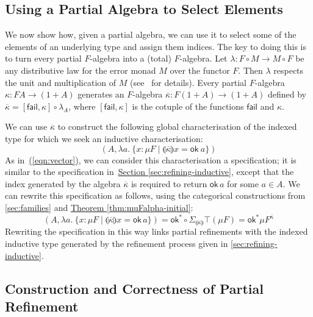 \documentclass{LMCS}
\newcommand{\sepbar}{\mathrel|}
\newcommand{\fold}[1]{\llparenthesis #1 \rrparenthesis}
\newcommand{\ok}{\mathsf{ok}}
\newcommand{\fail}{\mathsf{fail}}
\newcommand{\parenref}[1]{\hyperref[#1]{(\ref*{#1})}}
\newcommand{\thmref}[1]{\hyperref[#1]{Theorem \ref*{#1}}}
\begin{document}
\subsection{Using a Partial Algebra to Select Elements}

We now show how, given a partial algebra, we can use it to select some
of the elements of an underlying type and assign them indices. The key
to doing this is to turn every partial $F$-algebra into a (total)
$F$-algebra. Let $\lambda : F \circ M \to M \circ F$ be any
distributive law for the error monad $M$ over the functor $F$. Then
$\lambda$ respects the unit and multiplication of $M$
(see~\cite{barr83toposes} for details). Every partial $F$-algebra
$\kappa:FA \to (1+A)$ generates an $F$-algebra $\overline{\kappa} :
F(1 +A) \to (1 + A)$ defined by $\overline{\kappa} = [\fail, \kappa]
\circ \lambda_A$, where $[\fail, \kappa]$ is the cotuple of the
functions $\fail$ and $\kappa$.

We can use $\overline{\kappa}$ to construct the following global
characterisation of the indexed type for which we seek an inductive
characterisation:
\begin{displaymath}
  (A, \lambda a.\ \{ x : \mu F \sepbar \fold{\overline{\kappa}} x =
  \ok\ a \}) 
\end{displaymath}
As in~\parenref{eqn:vector}, we can consider this characterisation a
specification; it is similar to the specification
in~\hyperref[sec:refining-inductive]{Section
  \ref*{sec:refining-inductive}}, except that the index generated by
the algebra $\overline{\kappa}$ is required to return $\ok\, a$ for
some $a \in A$. We can rewrite this specification as follows, using
the categorical constructions from \autoref{sec:families} and
\thmref{thm:muFalpha-initial}:
\begin{equation}
  \label{eqn:muFkappa}  
  (A, \lambda a.\ \{ x : \mu F \sepbar \fold{\overline{\kappa}} x =
  \ok\, a \}) = \ok^* \circ \Sigma_{\fold{\overline{\kappa}}} \top (\mu F) =
  \ok^* \mu F^{\overline{\kappa}}
\end{equation}
Rewriting the specification in this way links partial refinements with
the indexed inductive type generated by the refinement process given
in \autoref{sec:refining-inductive}.

\subsection{Construction and Correctness of Partial Refinement}
\end{document}
